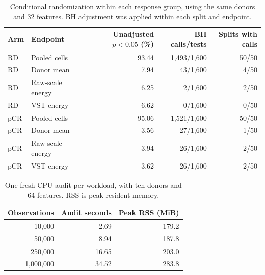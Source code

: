 \begin{table}[htbp]\centering\small
\caption{Conditional randomization within each response group, using the same donors and 32 features. BH adjustment was applied within each split and endpoint.}\label{tab:null}
\begin{tabular}{@{}llrrr@{}}\toprule
Arm & Endpoint & Unadjusted $p<0.05$ (\%) & BH calls/tests & Splits with calls\\\midrule
RD & Pooled cells & 93.44 & 1,493/1,600 & 50/50\\
RD & Donor mean & 7.94 & 43/1,600 & 4/50\\
RD & Raw-scale energy & 6.25 & 2/1,600 & 2/50\\
RD & VST energy & 6.62 & 0/1,600 & 0/50\\
pCR & Pooled cells & 95.06 & 1,521/1,600 & 50/50\\
pCR & Donor mean & 3.56 & 27/1,600 & 1/50\\
pCR & Raw-scale energy & 3.94 & 26/1,600 & 2/50\\
pCR & VST energy & 3.62 & 26/1,600 & 2/50\\
\bottomrule\end{tabular}\end{table}
\begin{table}[htbp]\centering\small
\caption{One fresh CPU audit per workload, with ten donors and 64 features. RSS is peak resident memory.}\label{tab:scaling}
\begin{tabular}{rrr}\toprule
Observations & Audit seconds & Peak RSS (MiB)\\\midrule
10,000 & 2.69 & 179.2\\
50,000 & 8.94 & 187.8\\
250,000 & 16.65 & 203.0\\
1,000,000 & 34.52 & 283.8\\
\bottomrule\end{tabular}\end{table}
